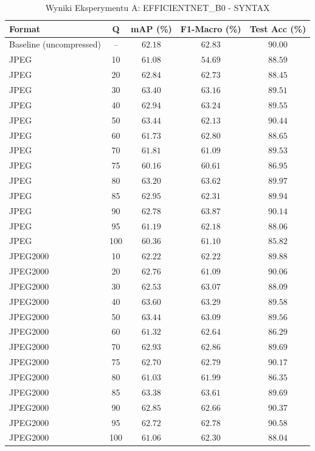 \begin{table}[htbp]
\centering
\caption{Wyniki Eksperymentu A: EFFICIENTNET_B0 - SYNTAX}
\label{tab:experiment_a_efficientnet_b0}
\begin{tabular}{lcccc}
\hline
Format & Q & mAP (\%) & F1-Macro (\%) & Test Acc (\%) \\
\hline
Baseline (uncompressed) & -- & $62.18$ & $62.83$ & $90.00$ \\
\hline
JPEG & 10 & $61.08$ & $54.69$ & $88.59$ \\
JPEG & 20 & $62.84$ & $62.73$ & $88.45$ \\
JPEG & 30 & $63.40$ & $63.16$ & $89.51$ \\
JPEG & 40 & $62.94$ & $63.24$ & $89.55$ \\
JPEG & 50 & $63.44$ & $62.13$ & $90.44$ \\
JPEG & 60 & $61.73$ & $62.80$ & $88.65$ \\
JPEG & 70 & $61.81$ & $61.09$ & $89.53$ \\
JPEG & 75 & $60.16$ & $60.61$ & $86.95$ \\
JPEG & 80 & $63.20$ & $63.62$ & $89.97$ \\
JPEG & 85 & $62.95$ & $62.31$ & $89.94$ \\
JPEG & 90 & $62.78$ & $63.87$ & $90.14$ \\
JPEG & 95 & $61.19$ & $62.18$ & $88.06$ \\
JPEG & 100 & $60.36$ & $61.10$ & $85.82$ \\
JPEG2000 & 10 & $62.22$ & $62.22$ & $89.88$ \\
JPEG2000 & 20 & $62.76$ & $61.09$ & $90.06$ \\
JPEG2000 & 30 & $62.53$ & $63.07$ & $88.09$ \\
JPEG2000 & 40 & $63.60$ & $63.29$ & $89.58$ \\
JPEG2000 & 50 & $63.44$ & $63.09$ & $89.56$ \\
JPEG2000 & 60 & $61.32$ & $62.64$ & $86.29$ \\
JPEG2000 & 70 & $62.93$ & $62.86$ & $89.69$ \\
JPEG2000 & 75 & $62.70$ & $62.79$ & $90.17$ \\
JPEG2000 & 80 & $61.03$ & $61.99$ & $86.35$ \\
JPEG2000 & 85 & $63.38$ & $63.61$ & $89.69$ \\
JPEG2000 & 90 & $62.85$ & $62.66$ & $90.37$ \\
JPEG2000 & 95 & $62.72$ & $62.78$ & $90.58$ \\
JPEG2000 & 100 & $61.06$ & $62.30$ & $88.04$ \\

\end{tabular}
\end{table}
